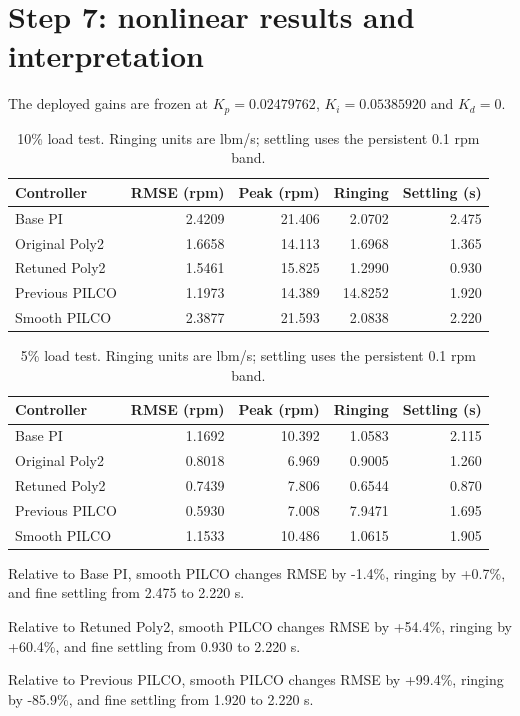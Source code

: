 \section{Step 7: nonlinear results and interpretation}
The deployed gains are frozen at $K_p=0.02479762$, $K_i=0.05385920$ and $K_d=0$.
\begin{table}[H]\centering\small\begin{tabular}{lrrrr}\toprule
Controller & RMSE (rpm) & Peak (rpm) & Ringing & Settling (s)\\\midrule
Base PI & 2.4209 & 21.406 & 2.0702 & 2.475\\
Original Poly2 & 1.6658 & 14.113 & 1.6968 & 1.365\\
Retuned Poly2 & 1.5461 & 15.825 & 1.2990 & 0.930\\
Previous PILCO & 1.1973 & 14.389 & 14.8252 & 1.920\\
Smooth PILCO & 2.3877 & 21.593 & 2.0838 & 2.220\\\bottomrule\end{tabular}\caption{10\% load test. Ringing units are lbm/s; settling uses the persistent 0.1 rpm band.}\end{table}
\begin{table}[H]\centering\small\begin{tabular}{lrrrr}\toprule
Controller & RMSE (rpm) & Peak (rpm) & Ringing & Settling (s)\\\midrule
Base PI & 1.1692 & 10.392 & 1.0583 & 2.115\\
Original Poly2 & 0.8018 & 6.969 & 0.9005 & 1.260\\
Retuned Poly2 & 0.7439 & 7.806 & 0.6544 & 0.870\\
Previous PILCO & 0.5930 & 7.008 & 7.9471 & 1.695\\
Smooth PILCO & 1.1533 & 10.486 & 1.0615 & 1.905\\\bottomrule\end{tabular}\caption{5\% load test. Ringing units are lbm/s; settling uses the persistent 0.1 rpm band.}\end{table}
Relative to Base PI, smooth PILCO changes RMSE by -1.4\%, ringing by +0.7\%, and fine settling from 2.475 to 2.220 s.

Relative to Retuned Poly2, smooth PILCO changes RMSE by +54.4\%, ringing by +60.4\%, and fine settling from 0.930 to 2.220 s.

Relative to Previous PILCO, smooth PILCO changes RMSE by +99.4\%, ringing by -85.9\%, and fine settling from 1.920 to 2.220 s.

